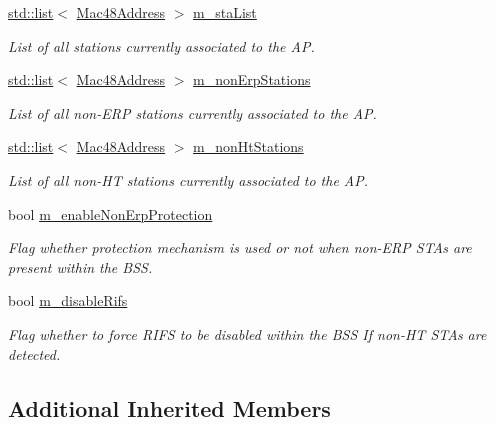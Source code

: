 \begin{DoxyCompactItemize}
\hyperlink{openflow-interface_8h_afd9bcfa176617760671b67580f536fa7}{std\+::list}$<$ \hyperlink{classns3_1_1Mac48Address}{Mac48\+Address} $>$ \hyperlink{classns3_1_1ApWifiMac_a2a483f2002457f12a9e53e4b227cf1e8}{m\+\_\+sta\+List}
\begin{DoxyCompactList}\small\item\em List of all stations currently associated to the AP. \end{DoxyCompactList}\item 
\hyperlink{openflow-interface_8h_afd9bcfa176617760671b67580f536fa7}{std\+::list}$<$ \hyperlink{classns3_1_1Mac48Address}{Mac48\+Address} $>$ \hyperlink{classns3_1_1ApWifiMac_a0f928a5ab62fc090a939a26ac3675caf}{m\+\_\+non\+Erp\+Stations}
\begin{DoxyCompactList}\small\item\em List of all non-\/\+E\+RP stations currently associated to the AP. \end{DoxyCompactList}\item 
\hyperlink{openflow-interface_8h_afd9bcfa176617760671b67580f536fa7}{std\+::list}$<$ \hyperlink{classns3_1_1Mac48Address}{Mac48\+Address} $>$ \hyperlink{classns3_1_1ApWifiMac_a148d1aa2c429b0530603c797775fa5da}{m\+\_\+non\+Ht\+Stations}
\begin{DoxyCompactList}\small\item\em List of all non-\/\+HT stations currently associated to the AP. \end{DoxyCompactList}\item 
bool \hyperlink{classns3_1_1ApWifiMac_a3f18f344b2eefe6357790600df8c4d23}{m\+\_\+enable\+Non\+Erp\+Protection}
\begin{DoxyCompactList}\small\item\em Flag whether protection mechanism is used or not when non-\/\+E\+RP S\+T\+As are present within the B\+SS. \end{DoxyCompactList}\item 
bool \hyperlink{classns3_1_1ApWifiMac_ab5ac2f56d033984a8db29d69aa230811}{m\+\_\+disable\+Rifs}
\begin{DoxyCompactList}\small\item\em Flag whether to force R\+I\+FS to be disabled within the B\+SS If non-\/\+HT S\+T\+As are detected. \end{DoxyCompactList}\end{DoxyCompactItemize}
\subsection*{Additional Inherited Members}


